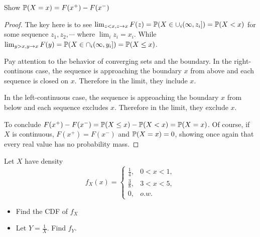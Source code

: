 \documentclass[10pt]{article}
\begin{document}
\setcounter{exercise}{0}
\begin{exercise}
    Show $\P(X = x) = F(x^+) - F(x^-)$
\end{exercise}

\begin{proof}
    The key here is to see $\lim_{z < x, z\to x}F(z) = \P(X \in \cup_i (\infty,
    z_i]) = \P(X < x)$ for some sequence $z_1, z_2, \cdots $ where $\lim_i z_i
    = x_i$.
    While $\lim_{y > x, y\to x}F(y) = \P(X \in \cap_i(\infty, y_i]) = \P(X \leq
    x)$.

    Pay attention to the behavior of converging sets and the boundary. In the
    right-continous case, the sequence is approaching the boundary $x$ from
    above and each sequence is closed on $x$. Therefore in the limit, they
    include $x$.

    In the left-continuous case, the sequence is approaching the boundary $x$
    from below and each sequence excludes $x$. Therefore in the limit, they
    exclude $x$.

    To conclude $F(x^+) - F(x^-) = \P(X \leq x ) - \P(X < x) = \P(X = x)$. Of
    course, if $X$ is continuous, $F(x^+) = F(x^-)$ and $\P(X = x) = 0$,
    showing once again that every real value has no probability mass.
\end{proof}

\setcounter{exercise}{3}
\begin{exercise}
    Let $X$ have density
    \[
    f_X(x) =
    \begin{cases}
    \frac{1}{4}, & 0 < x < 1, \\
    \frac{3}{8}, & 3 < x < 5, \\
    0, & o.w.
    \end{cases}
    \]
    \begin{itemize}
    \item{Find the CDF of $f_X$}
    \item{Let $Y = \frac{1}{X}$. Find $f_Y$.}
    \end{itemize}
\end{exercise}
\end{document}
